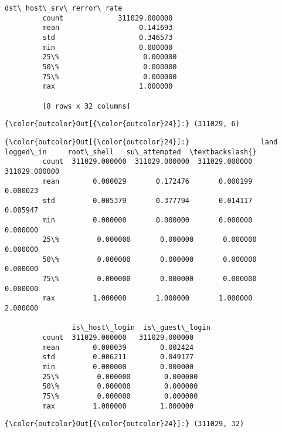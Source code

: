 \documentclass[11pt]{article}
\begin{document}
\begin{Verbatim}[commandchars=\\\{\}]
                dst\_host\_srv\_rerror\_rate  
         count             311029.000000  
         mean                   0.141693  
         std                    0.346573  
         min                    0.000000  
         25\%                    0.000000  
         50\%                    0.000000  
         75\%                    0.000000  
         max                    1.000000  
         
         [8 rows x 32 columns]
\end{Verbatim}
            
\begin{Verbatim}[commandchars=\\\{\}]
{\color{outcolor}Out[{\color{outcolor}24}]:} (311029, 6)
\end{Verbatim}
            
\begin{Verbatim}[commandchars=\\\{\}]
{\color{outcolor}Out[{\color{outcolor}24}]:}                 land      logged\_in     root\_shell   su\_attempted  \textbackslash{}
         count  311029.000000  311029.000000  311029.000000  311029.000000   
         mean        0.000029       0.172476       0.000199       0.000023   
         std         0.005379       0.377794       0.014117       0.005947   
         min         0.000000       0.000000       0.000000       0.000000   
         25\%         0.000000       0.000000       0.000000       0.000000   
         50\%         0.000000       0.000000       0.000000       0.000000   
         75\%         0.000000       0.000000       0.000000       0.000000   
         max         1.000000       1.000000       1.000000       2.000000   
         
                is\_host\_login  is\_guest\_login  
         count  311029.000000   311029.000000  
         mean        0.000039        0.002424  
         std         0.006211        0.049177  
         min         0.000000        0.000000  
         25\%         0.000000        0.000000  
         50\%         0.000000        0.000000  
         75\%         0.000000        0.000000  
         max         1.000000        1.000000  
\end{Verbatim}
            
\begin{Verbatim}[commandchars=\\\{\}]
{\color{outcolor}Out[{\color{outcolor}24}]:} (311029, 32)
\end{Verbatim}
            
\end{document}
